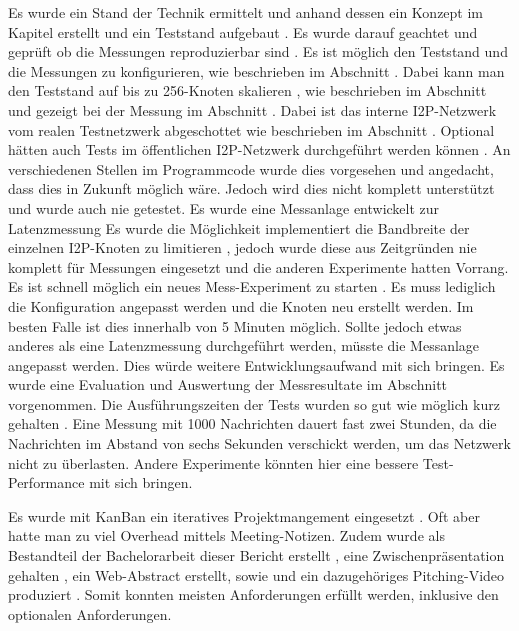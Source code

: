 Es wurde ein Stand der Technik ermittelt  und anhand dessen ein Konzept im Kapitel   erstellt und ein Teststand aufgebaut .
Es wurde darauf geachtet und geprüft ob die Messungen reproduzierbar sind .
Es ist möglich den Teststand und die Messungen zu konfigurieren, wie beschrieben im Abschnitt  .
Dabei kann man den Teststand auf bis zu 256-Knoten skalieren ,
wie beschrieben im Abschnitt  und gezeigt bei der Messung im Abschnitt .
Dabei ist das interne I2P-Netzwerk vom realen Testnetzwerk abgeschottet  wie beschrieben im Abschnitt \label{sec:netzwerkisolation}.
Optional hätten auch Tests im öffentlichen I2P-Netzwerk durchgeführt werden können .
An verschiedenen Stellen im Programmcode wurde dies vorgesehen und angedacht, dass dies in Zukunft möglich wäre.
Jedoch wird dies nicht komplett unterstützt und wurde auch nie getestet.
Es wurde eine Messanlage entwickelt zur Latenzmessung 
Es wurde die Möglichkeit implementiert die Bandbreite der einzelnen I2P-Knoten zu limitieren , jedoch wurde diese aus Zeitgründen nie komplett für Messungen eingesetzt und die anderen Experimente hatten Vorrang.
Es ist schnell möglich ein neues Mess-Experiment zu starten . Es muss lediglich die Konfiguration angepasst werden und die Knoten neu erstellt werden. Im besten Falle ist dies innerhalb von 5 Minuten möglich. Sollte jedoch etwas anderes als eine Latenzmessung durchgeführt werden, müsste die Messanlage angepasst werden. Dies würde weitere Entwicklungsaufwand mit sich bringen.
Es wurde eine Evaluation und Auswertung der Messresultate  im Abschnitt  vorgenommen.
Die Ausführungszeiten der Tests wurden so gut wie möglich kurz gehalten . Eine Messung mit 1000 Nachrichten dauert fast zwei Stunden, da die Nachrichten im Abstand von sechs Sekunden verschickt werden, um das Netzwerk nicht zu überlasten. Andere Experimente könnten hier eine bessere Test-Performance mit sich bringen.

Es wurde mit KanBan ein iteratives Projektmangement eingesetzt . Oft aber hatte man zu viel Overhead mittels Meeting-Notizen.
Zudem wurde als Bestandteil der Bachelorarbeit dieser Bericht erstellt , eine Zwischenpräsentation gehalten , ein Web-Abstract erstellt, sowie  und ein dazugehöriges Pitching-Video produziert .
Somit konnten meisten Anforderungen erfüllt werden, inklusive den optionalen Anforderungen.

